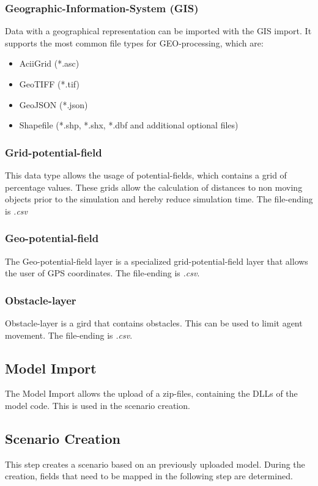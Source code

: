 \subsubsection{Geographic-Information-System (GIS)}
Data with a geographical representation can be imported with the GIS import. It supports the most common file types for GEO-processing, which are:
\begin{itemize}
	\item AciiGrid (*.asc)
	\item GeoTIFF (*.tif)
	\item GeoJSON (*.json)
	\item Shapefile (*.shp, *.shx, *.dbf and additional optional files)
\end{itemize}

\subsubsection{Grid-potential-field}
This data type allows the usage of potential-fields, which contains a grid of percentage values. These grids allow the calculation of distances to non moving objects prior to the simulation and hereby reduce simulation time. The file-ending is \textit{.csv}

\subsubsection{Geo-potential-field}
The Geo-potential-field layer is a specialized grid-potential-field layer that allows the user of GPS coordinates. The file-ending is \textit{.csv}.

\subsubsection{Obstacle-layer}
Obstacle-layer is a gird that contains obstacles. This can be used to limit agent movement. The file-ending is \textit{.csv}.


\subsection{Model Import}
The Model Import allows the upload of a zip-files, containing the DLLs of the model code. This is used in the scenario creation.


\subsection{Scenario Creation}
This step creates a scenario based on an previously uploaded model. During the creation, fields that need to be mapped in the following step are determined.


